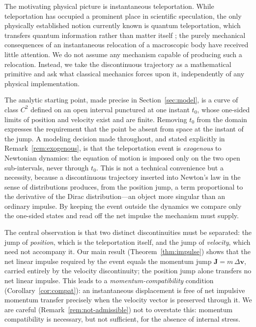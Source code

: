 \documentclass[11pt]{article}
\begin{document}
	The motivating physical picture is instantaneous teleportation.
	While teleportation has occupied a prominent place in scientific
	speculation, the only physically established notion currently known
	is quantum teleportation, which transfers quantum information rather
	than matter itself
	\cite{Bennett1993,Bouwmeester1997,NielsenChuang2010}; the purely
	mechanical consequences of an instantaneous relocation of a
	macroscopic body have received little attention. We do not assume any
	mechanism capable of producing such a relocation. Instead, we take
	the discontinuous trajectory as a mathematical primitive and ask what
	classical mechanics forces upon it, independently of any physical
	implementation.
	
	The analytic starting point, made precise in
	Section~\ref{sec:model}, is a curve of class $C^2$ defined on an open
	interval punctured at one instant $t_0$, whose one-sided limits of
	position and velocity exist and are finite. Removing $t_0$ from the
	domain expresses the requirement that the point be absent from space
	at the instant of the jump. A modeling decision made throughout, and
	stated explicitly in Remark~\ref{rem:exogenous}, is that the
	teleportation event is \emph{exogenous} to Newtonian dynamics: the
	equation of motion is imposed only on the two open sub-intervals,
	never through $t_0$. This is not a technical convenience but a
	necessity, because a discontinuous trajectory inserted into Newton's
	law in the sense of distributions produces, from the position jump, a
	term proportional to the derivative of the Dirac distribution---an
	object more singular than an ordinary impulse. By keeping the event
	outside the dynamics we compare only the one-sided states and read
	off the net impulse the mechanism must supply.
	
	The central observation is that two distinct discontinuities must be
	separated: the jump of \emph{position}, which is the teleportation
	itself, and the jump of \emph{velocity}, which need not accompany it.
	Our main result (Theorem~\ref{thm:impulse}) shows that the net linear
	impulse required by the event equals the momentum jump
	$\mathbf J=m\,\Delta\mathbf v$, carried entirely by the velocity
	discontinuity; the position jump alone transfers no net linear
	impulse. This leads to a \emph{momentum-compatibility} condition
	(Corollary~\ref{cor:compat}): an instantaneous displacement is free of
	net impulsive momentum transfer precisely when the velocity vector is
	preserved through it. We are careful (Remark~\ref{rem:not-admissible})
	not to overstate this: momentum compatibility is necessary, but not
	sufficient, for the absence of internal stress.
	
\end{document}
